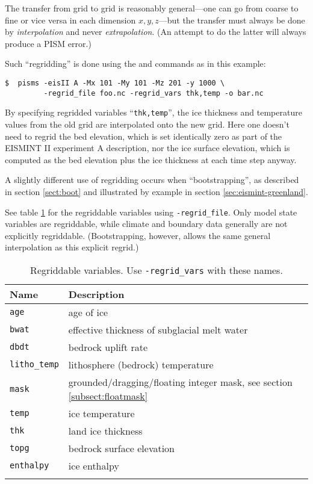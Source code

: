 The transfer from grid to grid is reasonably general---one can go from coarse to fine or vice versa in each dimension $x,y,z$---but the transfer must always be done by \emph{interpolation} and never \emph{extrapolation}.  (An attempt to do the latter will always produce a PISM error.)

Such ``regridding'' is done using the  and
 commands as in this example: 

\begin{verbatim}
$  pisms -eisII A -Mx 101 -My 101 -Mz 201 -y 1000 \
         -regrid_file foo.nc -regrid_vars thk,temp -o bar.nc
\end{verbatim}
\noindent By specifying regridded variables ``\texttt{thk,temp}'', the ice thickness and temperature values from the old grid are interpolated onto the new grid.  Here one doesn't need to regrid the bed elevation, which is set identically zero as part of the EISMINT II experiment A description, nor the ice surface elevation, which is computed as the bed elevation plus the ice thickness at each time step anyway.

A slightly different use of regridding occurs when ``bootstrapping'', as described in section \ref{sect:boot} and illustrated by example in section \ref{sec:eismint-greenland}.

See table \ref{tab:regridvar} for the regriddable variables using
\texttt{-regrid_file}.  Only model state variables are regriddable, while climate and boundary data generally are not explicitly regriddable.  (Bootstrapping, however, allows the same general interpolation as this explicit regrid.)

\begin{table}[ht]
\centering
\caption{Regriddable variables.  Use \texttt{-regrid_vars} with these names.}\label{tab:regridvar}
\begin{tabular}{ll}\toprule
\textbf{Name} & \textbf{Description}\\ \midrule
\texttt{age} & age of ice\\
\texttt{bwat} & effective thickness of subglacial melt water \\
\texttt{dbdt} & bedrock uplift rate \\
\texttt{litho_temp} & lithosphere (bedrock) temperature \\
\texttt{mask} & grounded/dragging/floating integer mask, see section \ref{subsect:floatmask} \\
\texttt{temp} & ice temperature \\
\texttt{thk} & land ice thickness \\
\texttt{topg} & bedrock surface elevation \\
\texttt{enthalpy} & ice enthalpy\\
\bottomrule
\normalsize
\end{tabular}
\end{table}

